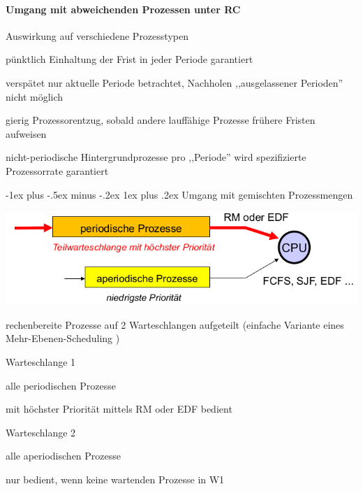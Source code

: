 \documentclass[a4paper]{article}
\makeatletter
\renewcommand{\subsubsection}{\@startsection{subsubsection}{3}{0mm}%
 {-1ex plus -.5ex minus -.2ex}%
 {1ex plus .2ex}%
 {\normalfont\small\bfseries}}
\makeatother
\begin{document}
\begin{multicols}{3}
    \paragraph{Umgang mit abweichenden Prozessen unter RC}

    Auswirkung auf verschiedene Prozesstypen
    \begin{description*}
        \item[pünktlich] Einhaltung der Frist in jeder Periode garantiert
        \item[verspätet] nur aktuelle Periode betrachtet, Nachholen ,,ausgelassener Perioden'' nicht möglich
        \item[gierig] Prozessorentzug, sobald andere lauffähige Prozesse frühere Fristen aufweisen
        \item[nicht-periodische Hintergrundprozesse] pro ,,Periode'' wird spezifizierte Prozessorrate garantiert
    \end{description*}

    \subsubsection{Umgang mit gemischten Prozessmengen}
    \begin{center}
        \includegraphics[width=.5\linewidth]{Assets/AdvancedOperatingSystems-gemischte-prozessmenge.png}
    \end{center}
    \begin{itemize*}
        \item rechenbereite Prozesse auf 2 Warteschlangen aufgeteilt (einfache Variante eines Mehr-Ebenen-Scheduling )
        \item Warteschlange 1
        \begin{itemize*}
            \item alle periodischen Prozesse
            \item mit höchster Priorität mittels RM oder EDF bedient
        \end{itemize*}
        \item Warteschlange 2
        \begin{itemize*}
            \item alle aperiodischen Prozesse
            \item nur bedient, wenn keine wartenden Prozesse in W1
        \end{itemize*}
    \end{itemize*}



\end{multicols}
\end{document}
